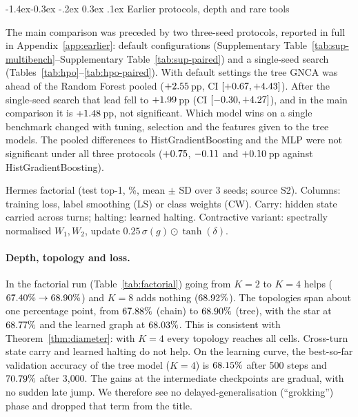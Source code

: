 \documentclass[10pt,twocolumn,letterpaper]{article}
\makeatletter
\renewcommand\subsection{\@startsection{subsection}{2}{\z@}%
  {-1.4ex\@plus -0.3ex \@minus -.2ex}%
  {0.3ex \@plus .1ex}%
  {\normalfont\normalsize\bfseries}}
\makeatother
\begin{document}
\subsection{Earlier protocols, depth and rare tools}\label{sec:default-results}

The main comparison was preceded by two three-seed protocols, reported in full in Appendix~\ref{app:earlier}: default configurations (Supplementary Table~\ref{tab:sup-multibench}--Supplementary Table~\ref{tab:sup-paired}) and a single-seed search (Tables~\ref{tab:hpo}--\ref{tab:hpo-paired}). With default settings the tree GNCA was ahead of the Random Forest pooled ($+2.55$\,pp, CI $[+0.67, +4.43]$). After the single-seed search that lead fell to $+1.99$\,pp (CI $[-0.30, +4.27]$), and in the main comparison it is $+1.48$\,pp, not significant. Which model wins on a single benchmark changed with tuning, selection and the features given to the tree models. The pooled differences to HistGradientBoosting and the MLP were not significant under all three protocols ($+0.75$, $-0.11$ and $+0.10$\,pp against HistGradientBoosting).

\begin{table}[t]
\centering
\scriptsize
\setlength{\tabcolsep}{3pt}
\caption{Hermes factorial (test top-1, \%, mean $\pm$ SD over 3 seeds; source S2). Columns: training loss, label smoothing (LS) or class weights (CW). Carry: hidden state carried across turns; halting: learned halting. Contractive variant: spectrally normalised $W_1,W_2$, update $0.25\,\sigma(g)\odot\tanh(\delta)$.}
\label{tab:factorial}

\end{table}

\paragraph{Depth, topology and loss.} In the factorial run (Table~\ref{tab:factorial}) going from $K{=}2$ to $K{=}4$ helps ($67.40\%\to68.90\%$) and $K{=}8$ adds nothing ($68.92\%$). The topologies span about one percentage point, from $67.88\%$ (chain) to $68.90\%$ (tree), with the star at $68.77\%$ and the learned graph at $68.03\%$. This is consistent with Theorem~\ref{thm:diameter}: with $K{=}4$ every topology reaches all cells. Cross-turn state carry and learned halting do not help. On the learning curve, the best-so-far validation accuracy of the tree model ($K{=}4$) is $68.15\%$ after 500 steps and $70.79\%$ after 3{,}000. The gains at the intermediate checkpoints are gradual, with no sudden late jump. We therefore see no delayed-generalisation (``grokking'') phase and dropped that term from the title.
\end{document}
